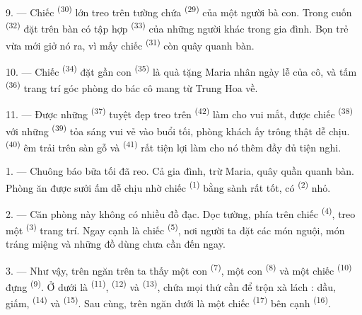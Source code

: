 9. --- Chiếc  \textsuperscript{(30)} lớn treo trên tường chứa
 \textsuperscript{(29)} của một người bà con. Trong cuốn
 \textsuperscript{(32)} đặt trên bàn có tập hợp 
\textsuperscript{(33)} của những người khác trong gia đình. Bọn trẻ vừa mới giở nó ra,
vì mấy chiếc  \textsuperscript{(31)} còn quây quanh bàn.

10. --- Chiếc  \textsuperscript{(34)} đặt gần con  \textsuperscript{(35)} là quà tặng Maria nhân ngày lễ của cô, và tấm
 \textsuperscript{(36)} trang trí góc phòng do bác cô mang từ Trung
Hoa về.

11. --- Được những  \textsuperscript{(37)} tuyệt đẹp treo trên
 \textsuperscript{(42)} làm cho vui mắt, được chiếc 
\textsuperscript{(38)} với những  \textsuperscript{(39)} tỏa sáng
vui vẻ vào buổi tối, phòng khách ấy trông thật dễ chịu. 
\textsuperscript{(40)} êm trải trên sàn gỗ và 
\textsuperscript{(41)} rất tiện lợi làm cho nó thêm đầy đủ tiện nghi.

\VUsaut{3.6mm}
\VUsaut{3.0mm}

1. --- Chuông báo bữa tối đã reo. Cả gia đình, trừ Maria, quây quần quanh bàn. Phòng ăn
được sưởi ấm dễ chịu nhờ chiếc  \textsuperscript{(1)} bằng sành rất tốt,
có  \textsuperscript{(2)} nhỏ.

2. --- Căn phòng này không có nhiều đồ đạc. Dọc tường, phía trên chiếc  \textsuperscript{(4)}, treo một  \textsuperscript{(3)}
trang trí. Ngay cạnh là chiếc  \textsuperscript{(5)}, nơi người ta đặt
các món nguội, món tráng miệng và những đồ dùng chưa cần đến ngay.

3. --- Như vậy, trên ngăn trên ta thấy một con  \textsuperscript{(7)},
một con  \textsuperscript{(8)} và một chiếc 
\textsuperscript{(10)} đựng  \textsuperscript{(9)}. Ở dưới là
 \textsuperscript{(11)},  \textsuperscript{(12)} và
 \textsuperscript{(13)}, chứa mọi thứ cần để trộn xà lách :
dầu, giấm,  \textsuperscript{(14)} và 
\textsuperscript{(15)}. Sau cùng, trên ngăn dưới là một chiếc 
\textsuperscript{(17)} bên cạnh  \textsuperscript{(16)}.

